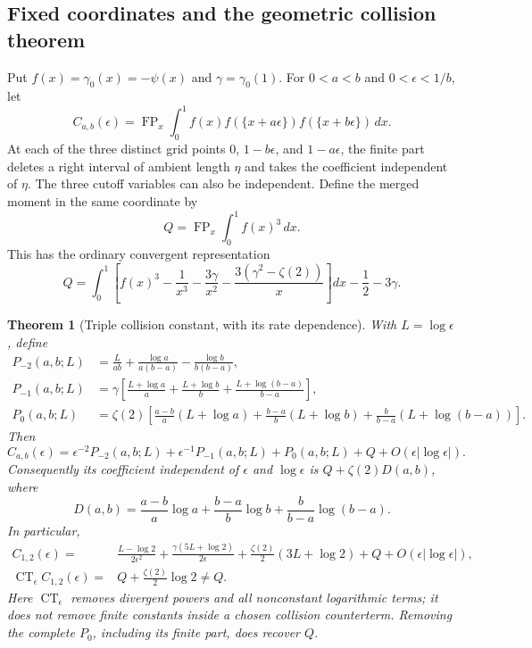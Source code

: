 \documentclass[11pt,a4paper]{article}
\numberwithin{equation}{section}
\newtheorem{theorem}{Theorem}[section]
\theoremstyle{definition}
\theoremstyle{remark}
\begin{document}
\subsection{Fixed coordinates and the geometric collision theorem}
\label{cl:geometric}

Put $f(x)=\gamma_0(x)=-\psi(x)$ and $\gamma=\gamma_0(1)$. For
$0<a<b$ and $0<\epsilon<1/b$, let
\[
 C_{a,b}(\epsilon)=\operatorname{FP}_x\int_0^1
 f(x)f(\{x+a\epsilon\})f(\{x+b\epsilon\})\,dx.
\]
At each of the three distinct grid points $0$, $1-b\epsilon$, and
$1-a\epsilon$, the finite part deletes a right interval of ambient
length $\eta$ and takes the coefficient independent of $\eta$.
The three cutoff variables can also be independent. Define the merged
moment in the same coordinate by
\begin{equation}\label{cl:merged}
 Q=\operatorname{FP}_x\int_0^1f(x)^3\,dx.
\end{equation}
This has the ordinary convergent representation
\begin{equation}\label{cl:merged-convergent}
 Q=\int_0^1\left[f(x)^3-\frac1{x^3}-\frac{3\gamma}{x^2}
       -\frac{3(\gamma^2-\zeta(2))}{x}\right]dx-\frac12-3\gamma.
\end{equation}

\begin{theorem}[Triple collision constant, with its rate dependence]
\label{cl:collision}
With $L=\log\epsilon$, define
\begin{align*}
 P_{-2}(a,b;L)&=\frac{L}{ab}
    +\frac{\log a}{a(b-a)}-\frac{\log b}{b(b-a)},\\
 P_{-1}(a,b;L)&=\gamma\left[
    \frac{L+\log a}{a}+\frac{L+\log b}{b}
    +\frac{L+\log(b-a)}{b-a}\right],\\
 P_0(a,b;L)&=\zeta(2)\left[
    \frac{a-b}{a}(L+\log a)
    +\frac{b-a}{b}(L+\log b)
    +\frac b{b-a}(L+\log(b-a))\right].
\end{align*}
Then
\begin{equation}\label{cl:rate-expansion}
 C_{a,b}(\epsilon)=\epsilon^{-2}P_{-2}(a,b;L)
    +\epsilon^{-1}P_{-1}(a,b;L)+P_0(a,b;L)+Q
    +O(\epsilon|\log\epsilon|).
\end{equation}
Consequently its coefficient independent of $\epsilon$ and $\log\epsilon$
is $Q+\zeta(2)D(a,b)$, where
\[
 D(a,b)=\frac{a-b}{a}\log a+\frac{b-a}{b}\log b
               +\frac b{b-a}\log(b-a).
\]
In particular,
\begin{align}
 C_{1,2}(\epsilon)
 ={}&\frac{L-\log2}{2\epsilon^2}
   +\frac{\gamma(5L+\log2)}{2\epsilon}
   +\frac{\zeta(2)}2(3L+\log2)+Q
   +O(\epsilon|\log\epsilon|),\label{cl:equally-spaced}\\
 \operatorname{CT}_{\epsilon}C_{1,2}(\epsilon)
 ={}&Q+\frac{\zeta(2)}2\log2\ne Q.\label{cl:finite-anomaly}
\end{align}
Here $\operatorname{CT}_{\epsilon}$ removes divergent powers and all
nonconstant logarithmic terms; it does not remove finite constants
inside a chosen collision counterterm. Removing the complete $P_0$,
including its finite part, does recover $Q$.
\end{theorem}
\end{document}

